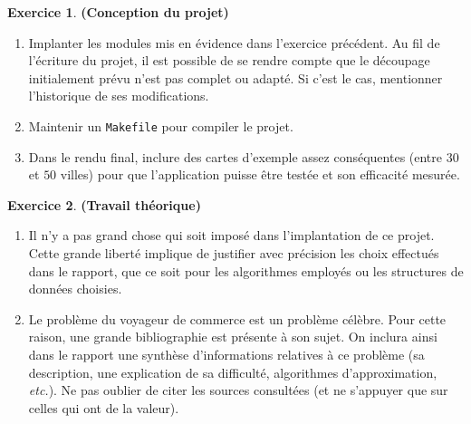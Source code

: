\documentclass[12pt]{article}
\theoremstyle{definition}
\newtheorem{Exercice}{Exercice}
\begin{document}
\begin{Exercice} {\bf (Conception du projet)}\smallskip

\begin{enumerate}
    \item Implanter les modules mis en évidence dans l'exercice
    précédent. Au fil de l'écriture du projet, il est possible de se
    rendre compte que le découpage initialement prévu n'est pas complet
    ou adapté. Si c'est le cas, mentionner l'historique de ses
    modifications.
    \smallskip

    \item Maintenir un {\tt Makefile} pour compiler le projet.
    \smallskip

    \item Dans le rendu final, inclure des cartes d'exemple assez
    conséquentes (entre $30$ et $50$ villes) pour que l'application
    puisse être testée et son efficacité mesurée.
\end{enumerate}
\end{Exercice}
\bigskip

\begin{Exercice} {\bf (Travail théorique)}\smallskip

\begin{enumerate}
    \item Il n'y a pas grand chose qui soit imposé dans l'implantation
    de ce projet. Cette grande liberté implique de justifier avec
    précision les choix effectués dans le rapport, que ce soit pour
    les algorithmes employés ou les structures de données choisies.
    \smallskip

    \item Le problème du voyageur de commerce est un problème célèbre.
    Pour cette raison, une grande bibliographie est présente à son sujet.
    On inclura ainsi dans le rapport une synthèse d'informations
    relatives à ce problème (sa description, une explication de sa
    difficulté, algorithmes d'approximation, {\em etc.}). Ne pas oublier
    de citer les sources consultées (et ne s'appuyer que sur celles qui
    ont de la valeur).
\end{enumerate}
\end{Exercice}
\end{document}
